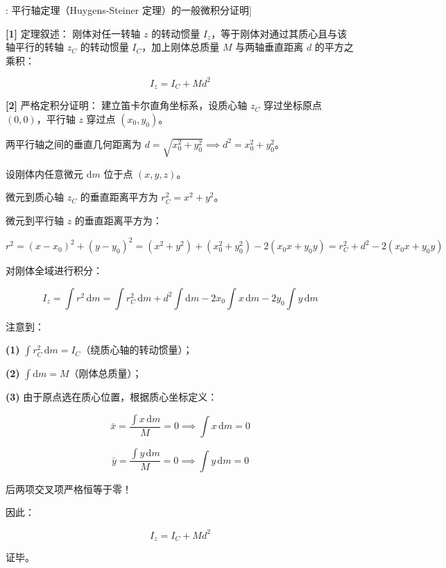 \documentclass[11pt,a4paper,UTF8]{ctexart}
\begin{document}
\begin{thmbox}[定理[1]: 平行轴定理（Huygens-Steiner 定理）的一般微积分证明]

\textbf{[1]} 定理叙述：
刚体对任一转轴 $z$ 的转动惯量 $I_z$，等于刚体对通过其质心且与该轴平行的转轴 $z_C$ 的转动惯量 $I_C$，加上刚体总质量 $M$ 与两轴垂直距离 $d$ 的平方之乘积：


\begin{equation*}
I_z = I_C + M d^2
\end{equation*}


\textbf{[2]} 严格定积分证明：
建立笛卡尔直角坐标系，设质心轴 $z_C$ 穿过坐标原点 $(0, 0)$，平行轴 $z$ 穿过点 $(x_0, y_0)$。

两平行轴之间的垂直几何距离为 $d = \sqrt{x_0^2 + y_0^2} \implies d^2 = x_0^2 + y_0^2$。

设刚体内任意微元 $\mathrm{d}m$ 位于点 $(x, y, z)$。

微元到质心轴 $z_C$ 的垂直距离平方为 $r_C^2 = x^2 + y^2$。

微元到平行轴 $z$ 的垂直距离平方为：


\begin{equation*}
r^2 = (x - x_0)^2 + (y - y_0)^2 = (x^2 + y^2) + (x_0^2 + y_0^2) - 2(x_0 x + y_0 y) = r_C^2 + d^2 - 2(x_0 x + y_0 y)
\end{equation*}


对刚体全域进行积分：


\begin{equation*}
I_z = \int r^2\,\mathrm{d}m = \int r_C^2\,\mathrm{d}m + d^2 \int \mathrm{d}m - 2x_0 \int x\,\mathrm{d}m - 2y_0 \int y\,\mathrm{d}m
\end{equation*}


注意到：

\textbf{(1)}  $\int r_C^2\,\mathrm{d}m = I_C$（绕质心轴的转动惯量）；

\textbf{(2)}  $\int \mathrm{d}m = M$（刚体总质量）；

\textbf{(3)}  由于原点选在质心位置，根据质心坐标定义：


\begin{equation*}
\bar{x} = \frac{\int x\,\mathrm{d}m}{M} = 0 \implies \int x\,\mathrm{d}m = 0
\end{equation*}



\begin{equation*}
\bar{y} = \frac{\int y\,\mathrm{d}m}{M} = 0 \implies \int y\,\mathrm{d}m = 0
\end{equation*}


后两项交叉项严格恒等于零！

因此：


\begin{equation*}
I_z = I_C + M d^2
\end{equation*}


证毕。

\end{thmbox}
\end{document}
